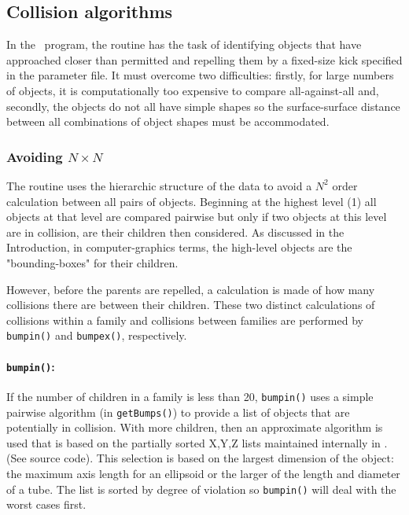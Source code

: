 \subsection{Collision algorithms}

In the \NAME\ program, the
 routine has the task of identifying objects that have approached closer
than permitted and repelling them by a fixed-size kick specified in the parameter file.
It must overcome two difficulties:  firstly, for large numbers of objects, it is
computationally too expensive to compare all-against-all and, secondly, the objects do not
all have simple shapes so the surface-surface distance between all combinations of
object shapes must be accommodated.

\subsubsection{Avoiding $N \times N$}

The  routine uses the hierarchic structure of the data to avoid a $N^2$
order calculation between all pairs of objects.  Beginning at the highest level (1)
all objects at that level are compared pairwise but only if two objects at this level
are in collision, are their children then considered. 
As discussed in the Introduction, in computer-graphics terms,
the high-level objects are the "bounding-boxes" for their children. 

However, before the parents are repelled, a calculation is made of how many collisions
there are between their children.  These two distinct calculations of collisions
within a family and collisions between families are performed by {\tt bumpin()}
and {\tt bumpex()}, respectively.

\paragraph{{\tt \bfseries bumpin()}:\\}

If the number of children in a family is less than 20, {\tt bumpin()}
uses a simple pairwise algorithm (in {\tt getBumps()}) to provide a list of objects that
are potentially in collision.  With more children, then an approximate algorithm
is used that is based on the partially sorted X,Y,Z lists maintained internally in \NAME . (See
source code).  This selection is based on the largest dimension of the object:  the maximum
axis length for an ellipsoid or the larger of the length and diameter of a tube.  The list
is sorted by degree of violation so {\tt bumpin()} will deal with the worst cases first.

